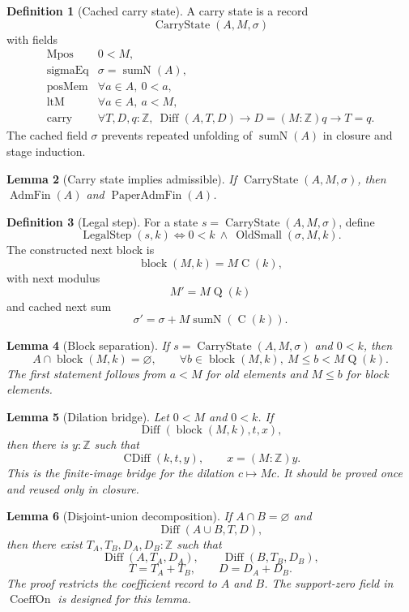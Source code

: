 \documentclass[11pt]{article}
\theoremstyle{definition}
\newtheorem{definition}{Definition}[section]
\theoremstyle{plain}
\newtheorem{lemma}[definition]{Lemma}
\theoremstyle{remark}
\newcommand{\Z}{\mathbb{Z}}
\newcommand{\SumN}{\operatorname{sumN}}
\newcommand{\CoeffOn}{\operatorname{CoeffOn}}
\newcommand{\Diff}{\operatorname{Diff}}
\newcommand{\AdmF}{\operatorname{AdmFin}}
\newcommand{\PaperAdmF}{\operatorname{PaperAdmFin}}
\newcommand{\Cblock}{\operatorname{C}}
\newcommand{\Qfun}{\operatorname{Q}}
\newcommand{\CDiff}{\operatorname{CDiff}}
\newcommand{\OldSmall}{\operatorname{OldSmall}}
\newcommand{\CarryState}{\operatorname{CarryState}}
\newcommand{\LegalStep}{\operatorname{LegalStep}}
\newcommand{\block}{\operatorname{block}}
\begin{document}
\begin{definition}[Cached carry state]\label{def:v9-carry-state}
A carry state is a record
\[
\CarryState(A,M,\sigma)
\]
with fields
\[
\begin{array}{ll}
\text{Mpos} & 0<M,\\
\text{sigmaEq} & \sigma=\SumN(A),\\
\text{posMem} & \forall a\in A,\ 0<a,\\
\text{ltM} & \forall a\in A,\ a<M,\\
\text{carry} & \forall T,D,q:\Z,\ \Diff(A,T,D)\to D=(M:\Z)q\to T=q.
\end{array}
\]
The cached field \(\sigma\) prevents repeated unfolding of \(\SumN(A)\) in closure and stage induction.
\end{definition}

\begin{lemma}[Carry state implies admissible]\label{lem:v9-state-admissible}
If \(\CarryState(A,M,\sigma)\), then \(\AdmF(A)\) and \(\PaperAdmF(A)\).
\end{lemma}

\begin{definition}[Legal step]\label{def:v9-legal-step}
For a state \(s=\CarryState(A,M,\sigma)\), define
\[
        \LegalStep(s,k)\Longleftrightarrow 0<k\ \wedge\ \OldSmall(\sigma,M,k).
\]
The constructed next block is
\[
        \block(M,k)=M\Cblock(k),
\]
with next modulus
\[
        M'=M\Qfun(k)
\]
and cached next sum
\[
        \sigma'=\sigma+M\SumN(\Cblock(k)).
\]
\end{definition}

\begin{lemma}[Block separation]\label{lem:v9-block-separation}
If \(s=\CarryState(A,M,\sigma)\) and \(0<k\), then
\[
        A\cap\block(M,k)=\varnothing,
        \qquad
        \forall b\in\block(M,k),\ M\le b<M\Qfun(k).
\]
The first statement follows from \(a<M\) for old elements and \(M\le b\) for block elements.
\end{lemma}

\begin{lemma}[Dilation bridge]\label{lem:v9-dilation-bridge}
Let \(0<M\) and \(0<k\).  If
\[
        \Diff(\block(M,k),t,x),
\]
then there is \(y:\Z\) such that
\[
        \CDiff(k,t,y),
        \qquad
        x=(M:\Z)y.
\]
This is the finite-image bridge for the dilation \(c\mapsto M c\).  It should be proved once and reused only in closure.
\end{lemma}

\begin{lemma}[Disjoint-union decomposition]\label{lem:v9-union-decompose}
If \(A\cap B=\varnothing\) and
\[
        \Diff(A\cup B,T,D),
\]
then there exist \(T_A,T_B,D_A,D_B:\Z\) such that
\[
        \Diff(A,T_A,D_A),
        \qquad
        \Diff(B,T_B,D_B),
\]
\[
        T=T_A+T_B,
        \qquad
        D=D_A+D_B.
\]
The proof restricts the coefficient record to \(A\) and \(B\).  The support-zero field in \(\CoeffOn\) is designed for this lemma.
\end{lemma}
\end{document}
